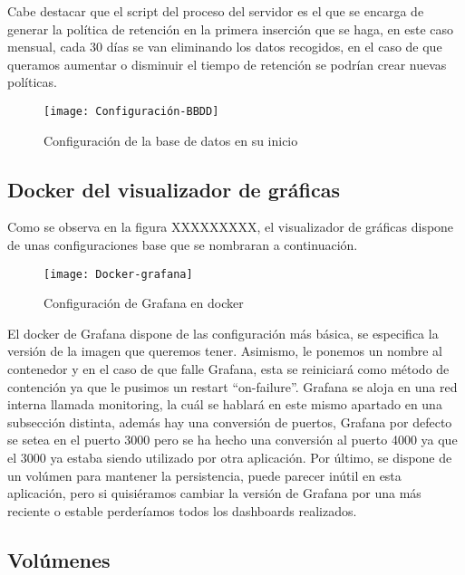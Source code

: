 \documentclass[ spanish, a4paper, 12pt, oneside]{report}
\begin{document}
Cabe destacar que el script del proceso del servidor es el que se encarga de generar la política de retención en la primera inserción que se haga, en este caso mensual, cada 30 días se van eliminando los datos recogidos, en el caso de que queramos aumentar o disminuir el tiempo de retención se podrían crear nuevas políticas. \\

\begin{figure}[!h]
   \centering
   \texttt{[image: Configuración-BBDD]}\\
      \caption{\label{fig: Configuración de la base de datos en su inicio} Configuración de la base de datos en su inicio}
\end{figure}
\subsection{Docker del visualizador de gráficas}
Como se observa en la figura XXXXXXXXX, el visualizador de gráficas dispone de unas configuraciones base que se nombraran a continuación.\\

\begin{figure}[!h]
   \centering
   \texttt{[image: Docker-grafana]}\\
      \caption{\label{fig: Configuración de Grafana en docker} Configuración de Grafana en docker}
\end{figure}

El docker de Grafana dispone de las configuración más básica, se especifica la versión de la imagen que queremos tener. Asimismo, le ponemos un nombre al contenedor y en el caso de que falle Grafana, esta se reiniciará como método de contención ya que le pusimos un restart ``on-failure''.
Grafana se aloja en una red interna llamada monitoring, la cuál se hablará en este mismo apartado en una subsección distinta, además hay una conversión de puertos, Grafana por defecto se setea en el puerto 3000 pero se ha hecho una conversión al puerto 4000 ya que el 3000 ya estaba siendo 
utilizado por otra aplicación. Por último, se dispone de un volúmen para mantener la persistencia, puede parecer inútil en esta aplicación, pero si quisiéramos cambiar la versión de Grafana por una más reciente o estable perderíamos todos los dashboards realizados. \\
\subsection{Volúmenes}
\end{document}
